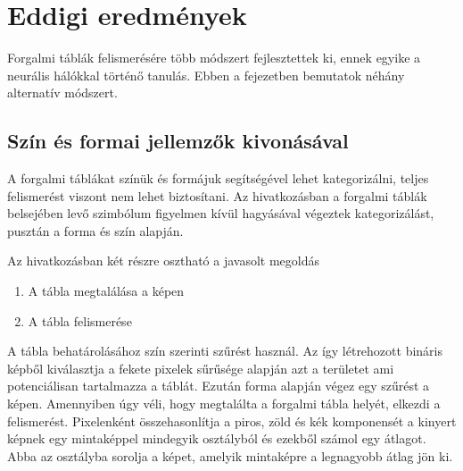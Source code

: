 \chapter{Eddigi eredmények}\label{ch:eredmenyek}

Forgalmi táblák felismerésére több módszert fejlesztettek ki, ennek egyike a neurális hálókkal történő tanulás. Ebben a fejezetben bemutatok néhány alternatív módszert.

\section{Szín és formai jellemzők kivonásával}

A forgalmi táblákat színük és formájuk segítségével lehet kategorizálni, teljes felismerést viszont nem lehet biztosítani. Az \cite{1} hivatkozásban a forgalmi táblák belsejében levő szimbólum figyelmen kívül hagyásával végeztek kategorizálást, pusztán a forma és szín alapján. 

Az \cite{6} hivatkozásban két részre osztható a javasolt megoldás
\begin{enumerate}
	\item A tábla megtalálása a képen
	\item A tábla felismerése
\end{enumerate}

A tábla behatárolásához szín szerinti szűrést használ. Az így létrehozott bináris képből kiválasztja a fekete pixelek sűrűsége alapján azt a területet ami potenciálisan tartalmazza a táblát. Ezután forma alapján végez egy szűrést a képen. Amennyiben úgy véli, hogy megtalálta a forgalmi tábla helyét, elkezdi a felismerést. Pixelenként összehasonlítja a piros, zöld és kék komponensét a kinyert képnek egy mintaképpel mindegyik osztályból és ezekből számol egy átlagot. Abba az osztályba sorolja a képet, amelyik mintaképre a legnagyobb átlag jön ki.
